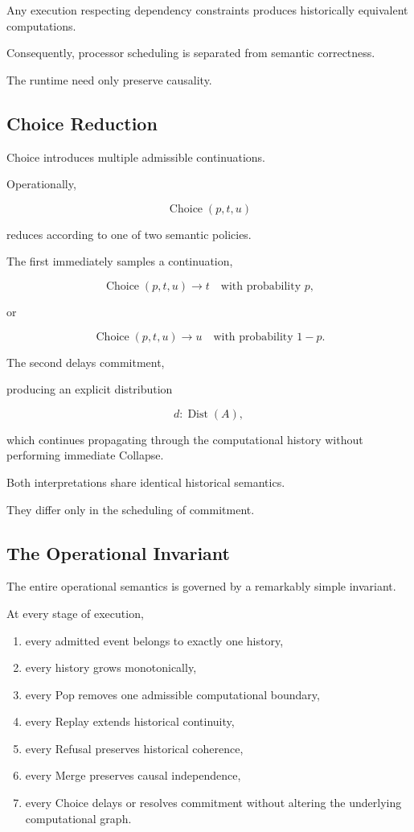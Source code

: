 \documentclass[12pt,oneside]{article}
\theoremstyle{definition}
\theoremstyle{remark}
\begin{document}
Any execution respecting dependency constraints produces historically
equivalent computations.

Consequently, processor scheduling is separated from semantic correctness.

The runtime need only preserve causality.

\subsection{Choice Reduction}

Choice introduces multiple admissible continuations.

Operationally,

\[
\operatorname{Choice}(p,t,u)
\]

reduces according to one of two semantic policies.

The first immediately samples a continuation,

\[
\operatorname{Choice}(p,t,u)
\longrightarrow
t
\quad
\text{with probability }p,
\]

or

\[
\operatorname{Choice}(p,t,u)
\longrightarrow
u
\quad
\text{with probability }1-p.
\]

The second delays commitment,

producing an explicit distribution

\[
d:\operatorname{Dist}(A),
\]

which continues propagating through the computational history without
performing immediate Collapse.

Both interpretations share identical historical semantics.

They differ only in the scheduling of commitment.

\subsection{The Operational Invariant}

The entire operational semantics is governed by a remarkably simple invariant.

At every stage of execution,

\begin{enumerate}
\item every admitted event belongs to exactly one history,
\item every history grows monotonically,
\item every Pop removes one admissible computational boundary,
\item every Replay extends historical continuity,
\item every Refusal preserves historical coherence,
\item every Merge preserves causal independence,
\item every Choice delays or resolves commitment without altering the
underlying computational graph.
\end{enumerate}
\end{document}
